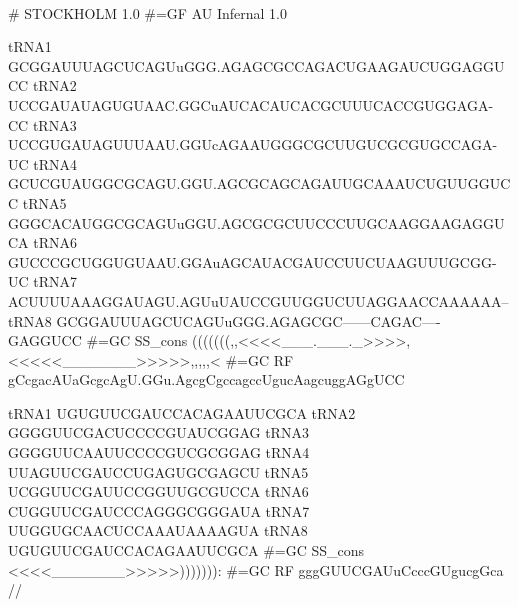 {\samepage
{}\\

\begin{sreoutput}

# STOCKHOLM 1.0
#=GF AU Infernal 1.0

tRNA1        GCGGAUUUAGCUCAGUuGGG.AGAGCGCCAGACUGAAGAUCUGGAGGUCC
tRNA2        UCCGAUAUAGUGUAAC.GGCuAUCACAUCACGCUUUCACCGUGGAGA-CC
tRNA3        UCCGUGAUAGUUUAAU.GGUcAGAAUGGGCGCUUGUCGCGUGCCAGA-UC
tRNA4        GCUCGUAUGGCGCAGU.GGU.AGCGCAGCAGAUUGCAAAUCUGUUGGUCC
tRNA5        GGGCACAUGGCGCAGUuGGU.AGCGCGCUUCCCUUGCAAGGAAGAGGUCA
tRNA6        GUCCCGCUGGUGUAAU.GGAuAGCAUACGAUCCUUCUAAGUUUGCGG-UC
tRNA7        ACUUUUAAAGGAUAGU.AGUuUAUCCGUUGGUCUUAGGAACCAAAAAA--
tRNA8        GCGGAUUUAGCUCAGUuGGG.AGAGCGC------CAGAC----GAGGUCC
#=GC SS_cons (((((((,,<<<<___.___._>>>>,<<<<<_______>>>>>,,,,,<
#=GC RF      gCcgacAUaGcgcAgU.GGu.AgcgCgccagccUgucAagcuggAGgUCC

tRNA1        UGUGUUCGAUCCACAGAAUUCGCA
tRNA2        GGGGUUCGACUCCCCGUAUCGGAG
tRNA3        GGGGUUCAAUUCCCCGUCGCGGAG
tRNA4        UUAGUUCGAUCCUGAGUGCGAGCU
tRNA5        UCGGUUCGAUUCCGGUUGCGUCCA
tRNA6        CUGGUUCGAUCCCAGGGCGGGAUA
tRNA7        UUGGUGCAACUCCAAAUAAAAGUA
tRNA8        UGUGUUCGAUCCACAGAAUUCGCA
#=GC SS_cons <<<<_______>>>>>))))))):
#=GC RF      gggGUUCGAUuCcccGUgucgGca
//
\end{sreoutput}
}

